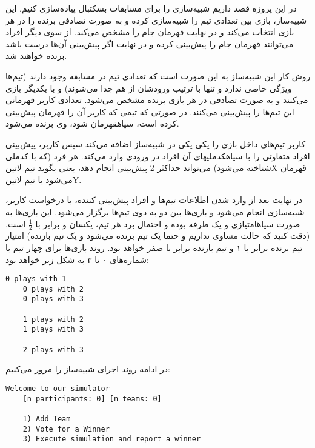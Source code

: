 \documentclass[../main.tex]{subfiles}
\begin{document}


در این پروژه قصد داریم شبیه‌سازی را برای مسابقات بسکتبال پیاده‌سازی کنیم.
این شبیه‌ساز، بازی بین تعدادی تیم را شبیه‌سازی کرده و به صورت تصادفی برنده را در
هر بازی انتخاب می‌کند و در نهایت قهرمان جام را مشخص می‌کند.
از سوی دیگر افراد می‌توانند قهرمان جام را پیش‌بینی کرده و در نهایت اگر پیش‌بینی آن‌ها
درست باشد برنده خواهند شد.


روش کار این شبیه‌ساز به این صورت است که تعدادی تیم در مسابقه وجود دارند (تیم‌ها ویژگی خاصی ندارد و تنها با ترتیب ورودشان از هم جدا می‌شوند)
و با یکدیگر بازی می‌کنند و به صورت تصادفی در هر بازی برنده مشخص می‌شود. تعدادی کاربر قهرمانی این تیم‌ها را پیش‌بینی می‌کنند.
در صورتی که تیمی که کاربر آن را قهرمان پیش‌بینی کرده است، ‌سیاه{قهرمان} شود، وی برنده می‌شود.

کاربر تیم‌های داخل بازی را یکی یکی در شبیه‌ساز اضافه می‌کند
سپس کاربر، پیش‌بینی افراد متفاوتی را با ‌سیاه{کدملی}های آن افراد در ورودی وارد می‌کند.
هر فرد (که با کدملی شناخته می‌شود) می‌تواند حداکثر 2 پیش‌بینی انجام دهد،
یعنی بگوید تیم ‌لاتین{X} قهرمان می‌شود یا تیم ‌لاتین{Y}.

در نهایت بعد از وارد شدن اطلاعات تیم‌ها و افراد پیش‌بینی کننده، با درخواست کاربر، شبیه‌سازی انجام می‌شود و
بازی‌ها بین دو به دوی تیم‌ها برگزار می‌شود.
این بازی‌ها به صورت
‌سیاه{امتیازی و یک طرفه}
بوده و احتمال برد هر تیم‌، یکسان و برابر با
\(\frac{1}{2}\)
است. 
(دقت کنید که حالت مساوی نداریم و حتما یک تیم برنده می‌شود و یک تیم بازنده)
امتیاز تیم برنده برابر با ۱ و تیم بازنده برابر با صفر خواهد بود.
روند بازی‌ها برای چهار تیم با شماره‌های ۰ تا ۳ به شکل زیر خواهد بود:

\begin{latin}
\begin{lstlisting}[]
    0 plays with 1
    0 plays with 2
    0 plays with 3

    1 plays with 2
    1 plays with 3

    2 plays with 3
\end{lstlisting}
\end{latin}


در ادامه روند اجرای شبیه‌ساز را مرور می‌کنیم:

\begin{latin}
\begin{lstlisting}[]
    Welcome to our simulator
    [n_participants: 0] [n_teams: 0]

    1) Add Team
    2) Vote for a Winner
    3) Execute simulation and report a winner
\end{lstlisting}
\end{latin}
\end{document}
